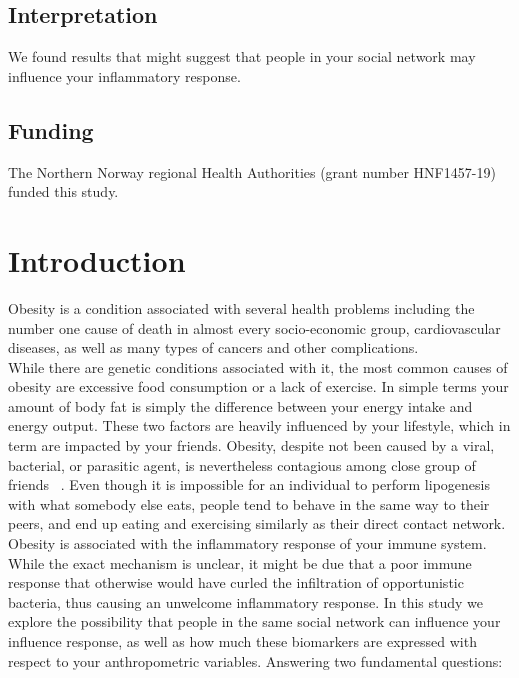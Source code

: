\documentclass[10pt, a4paper, twocolumn]{article} %
\begin{document}
\subsection{Interpretation}

We found results that might suggest that people in your social network may influence your inflammatory response.\\

\subsection{Funding}

The Northern Norway regional Health Authorities (grant number HNF1457-19) funded this study.\\


 
\section{Introduction}

Obesity is a condition associated with several health problems including the number one cause of death in almost every socio-economic group, cardiovascular diseases, as well as many types of cancers and other complications.\\

While there are genetic conditions associated with it, the most common causes of obesity are excessive food consumption or a lack of exercise. In simple terms your amount of body fat is simply the difference between your energy intake and energy output. These two factors are heavily influenced by your lifestyle, which in term are impacted by your friends. Obesity, despite not been caused by a viral, bacterial, or parasitic agent, is nevertheless contagious among close group of friends ~\cite{ref:MainObesityArticle}. Even though it is impossible for an individual to perform lipogenesis with what somebody else eats, people tend to behave in the same way to their peers, and end up eating and exercising similarly as their direct contact network.\\

Obesity is associated with the inflammatory response of your immune system. While the exact mechanism is unclear, it might be due that a poor immune response that otherwise would have curled the infiltration of opportunistic bacteria, thus causing an unwelcome inflammatory response. In this study we explore the possibility that people in the same social network can influence your influence response, as well as how much these biomarkers are expressed with respect to your anthropometric variables. Answering two fundamental questions:\\
\end{document}
